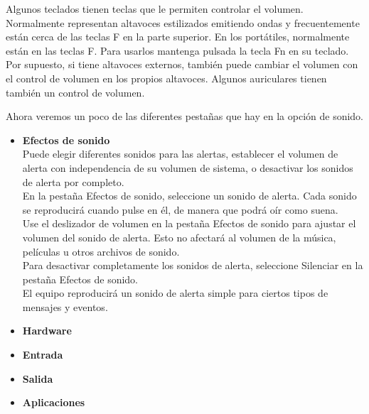 Algunos teclados tienen teclas que le permiten controlar el volumen. Normalmente representan altavoces estilizados emitiendo ondas y frecuentemente están cerca de las teclas F en la parte superior. En los portátiles, normalmente están en las teclas F. Para usarlos mantenga pulsada la tecla Fn en su teclado.\\

Por supuesto, si tiene altavoces externos, también puede cambiar el volumen con el control de volumen en los propios altavoces. Algunos auriculares tienen también un control de volumen.

Ahora veremos un poco de las diferentes pestañas que hay en la opción de sonido.\\
\begin{itemize}
\item{\bf Efectos de sonido}\\
Puede elegir diferentes sonidos para las alertas, establecer el volumen de alerta con independencia de su volumen de sistema, o desactivar los sonidos de alerta por completo.\\

En la pestaña Efectos de sonido, seleccione un sonido de alerta. Cada sonido se reproducirá cuando pulse en él, de manera que podrá oír como suena.\\

Use el deslizador de volumen en la pestaña Efectos de sonido para ajustar el volumen del sonido de alerta. Esto no afectará al volumen de la música, películas u otros archivos de sonido.\\
Para desactivar completamente los sonidos de alerta, seleccione Silenciar en la pestaña Efectos de sonido.\\
El equipo reproducirá un sonido de alerta simple para ciertos tipos de mensajes y eventos.
\item{\bf Hardware}\\

\item{\bf Entrada}\\
\item{\bf Salida}\\
\item{\bf Aplicaciones}\\
\end{itemize}
